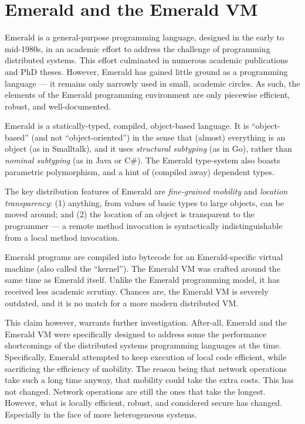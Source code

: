 \section{Emerald and the Emerald VM}

Emerald is a general-purpose programming language, designed in the
early to mid-1980s, in an academic effort to address the challenge of
programming distributed systems. This effort culminated in numerous
academic publications\cite{emerald:tse:1987, emerald:tocs:1988,
emerald:spe:1991} and PhD theses\cite{emerald:phd:norman-c-hutchinson,
emerald:phd:eric-jul, emerald:phd:niels-christian-juul}. However,
Emerald has gained little ground as a programming language --- it
remains only narrowly used in small, academic circles. As such, the
elements of the Emerald programming environment are only piecewise
efficient, robust, and well-documented.

Emerald is a statically-typed, compiled, object-based language. It is
``object-based'' (and not ``object-oriented'') in the sense that
(almost) everything is an object (as in Smalltalk), and it uses
\emph{structural subtyping} (as in Go), rather than \emph{nominal
subtyping} (as in Java or C\#). The Emerald type-system also boasts
parametric polymorphism, and a hint of (compiled away) dependent
types.

The key distribution features of Emerald are \emph{fine-grained
mobility} and \emph{location transparency}: (1) anything, from values
of basic types to large objects, can be moved around; and (2) the
location of an object is transparent to the programmer --- a remote
method invocation is syntactically indistinguishable from a local
method invocation.

Emerald programs are compiled into bytecode for an Emerald-specific
virtual machine (also called the
``kernel''\cite{emerald:phd:eric-jul}). The Emerald VM was crafted
around the same time as Emerald itself.  Unlike the Emerald
programming model, it has received less academic scrutiny. Chances
are, the Emerald VM is severely outdated, and it is no match for a
more modern distributed VM.

This claim however, warrants further investigation. After-all, Emerald
and the Emerald VM were specifically designed to address some the
performance shortcomings of the distributed systems programming
languages at the time\cite{emerald:phd:eric-jul}. Specifically,
Emerald attempted to keep execution of local code efficient, while
sacrificing the efficiency of mobility. The reason being that network
operations take such a long time anyway, that mobility could take the
extra costs. This has not changed. Network operations are still the
ones that take the longest. However, what is locally efficient,
robust, and considered secure has changed. Especially in the face of
more heterogeneous systems.
